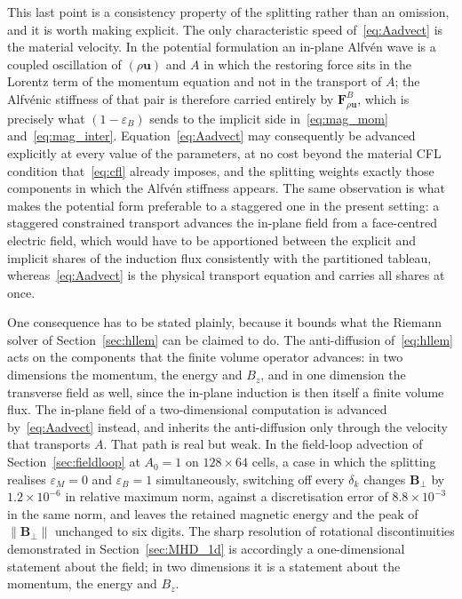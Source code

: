 \documentclass[a4paper,fleqn]{cas-sc}
\theoremstyle{remark}
\newcommand{\eps}{\varepsilon}
\newcommand{\epsM}{\eps_{M}}
\newcommand{\epsB}{\eps_{B}}
\newcommand{\Bb}{\mathbf{B}}
\begin{document}
This last point is a consistency property of the splitting rather than an
omission, and it is worth making explicit. The only characteristic speed
of~\eqref{eq:Aadvect} is the material velocity. In the potential formulation an
in-plane Alfv\'en wave is a coupled oscillation of $(\rho\mathbf u)$ and $A$ in
which the restoring force sits in the Lorentz term of the momentum equation and
not in the transport of $A$; the Alfv\'enic stiffness of that pair is therefore
carried entirely by $\mathbf F^{B}_{\rho\mathbf{u}}$, which is precisely what
$(1-\epsB)$ sends to the implicit side in~\eqref{eq:mag_mom}
and~\eqref{eq:mag_inter}. Equation~\eqref{eq:Aadvect} may consequently be
advanced explicitly at every value of the parameters, at no cost beyond the
material CFL condition that~\eqref{eq:cfl} already imposes, and the splitting
weights exactly those components in which the Alfv\'en stiffness appears. The
same observation is what makes the potential form preferable to a staggered one
in the present setting: a staggered constrained transport advances the in-plane
field from a face-centred electric field, which would have to be apportioned
between the explicit and implicit shares of the induction flux consistently with
the partitioned tableau, whereas~\eqref{eq:Aadvect} is the physical transport
equation and carries all shares at once.

One consequence has to be stated plainly, because it bounds what the Riemann
solver of Section~\ref{sec:hllem} can be claimed to do. The anti-diffusion
of~\eqref{eq:hllem} acts on the components that the finite volume operator
advances: in two dimensions the momentum, the energy and $B_z$, and in one
dimension the transverse field as well, since the in-plane induction is then
itself a finite volume flux. The in-plane field of a two-dimensional
computation is advanced by~\eqref{eq:Aadvect} instead, and inherits the
anti-diffusion only through the velocity that transports $A$. That path is
real but weak. In the field-loop advection of
Section~\ref{sec:fieldloop} at $A_0=1$ on $128\times64$ cells, a case in which
the splitting realises $\epsM=0$ and $\epsB=1$ simultaneously, switching off
every $\delta_k$ changes $\Bb_\perp$ by $1.2\times10^{-6}$ in relative maximum
norm, against a discretisation error of $8.8\times10^{-3}$ in the same norm,
and leaves the retained magnetic energy and the peak of $\|\Bb_\perp\|$
unchanged to six digits. The sharp resolution of rotational discontinuities
demonstrated in Section~\ref{sec:MHD_1d} is accordingly a one-dimensional
statement about the field; in two dimensions it is a statement about the
momentum, the energy and $B_z$.
\end{document}
